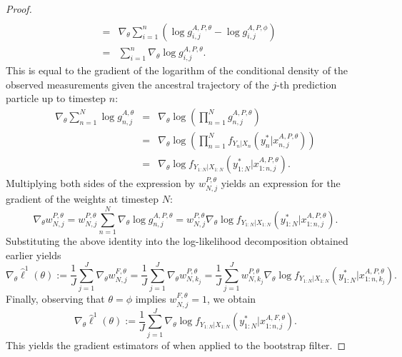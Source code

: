 \begin{proof}
\begin{eqnarray}
 \\
 &=& \nabla_\theta \sum_{i=1}^n \left(\log g_{i,j}^{A,P,\theta} - \log g_{i,j}^{A,P,\phi}\right)
 \\
 &=& \sum_{i=1}^n \nabla_\theta \log g_{i,j}^{A,P,\theta}.
\end{eqnarray}
This is equal to the gradient of the logarithm of the conditional density of the observed measurements given the ancestral trajectory of the $j$-th prediction particle up to timestep $n$:
\begin{eqnarray}  
\nabla_\theta \sum_{n=1}^N \log g_{n,j}^{A,\theta} &=& \nabla_\theta \log\left(\prod_{n=1}^N g_{n,j}^{A,P,\theta}\right) 
\\
&=&  \nabla_\theta \log\left(\prod_{n=1}^N f_{Y_n|X_n}\left(y_n^* | x_{n,j}^{A, P,\theta}\right)\right)
\\
&=& \nabla_\theta \log f_{Y_{1:N}|X_{1:N}}\left(y_{1:N}^* | x_{1:n,j}^{A, P,\theta}\right).
\end{eqnarray}
Multiplying both sides of the expression by $w_{N,j}^{P,\theta} $ yields an expression for the gradient of the weights at timestep $N$:
\begin{equation}
\nabla_\theta w_{N,j}^{P,\theta} = w_{N,j}^{P,\theta} \sum_{n=1}^N \nabla_\theta \log g_{n,j}^{A,P,\theta} = w_{N,j}^{P,\theta} \nabla_\theta \log f_{Y_{1:N}|X_{1:N}}\left(y_{1:N}^* | x_{1:n,j}^{A, P,\theta}\right).    
\end{equation}
Substituting the above identity into the log-likelihood decomposition obtained earlier  yields
\begin{equation}
    \nabla_\theta \hat{\ell}^1(\theta) := \frac{1}{J}\sum_{j=1}^J \nabla_\theta w_{N,j}^{F,\theta} =\frac{1}{J}\sum_{j=1}^J \nabla_\theta w_{N,k_j}^{P,\theta} = \frac{1}{J}\sum_{j=1}^J w_{N,k_j}^{P,\theta} \nabla_\theta \log f_{Y_{1:N}|X_{1:N}}\left(y_{1:N}^* | x_{1:n,k_j}^{A, P,\theta}\right).
\end{equation}
Finally, observing that $\theta=\phi$ implies $w_{N,j}^{F,\theta}=1$, we obtain 
\begin{equation}
    \nabla_\theta \hat{\ell}^1(\theta) := \frac{1}{J}\sum_{j=1}^J \nabla_\theta \log f_{Y_{1:N}|X_{1:N}}\left(y_{1:N}^* | x_{1:n,j}^{A, F,\theta}\right).
\end{equation}
This yields the gradient estimators of \cite{poyiadjis11, scibior21} when applied to the bootstrap filter. 
\end{proof}

